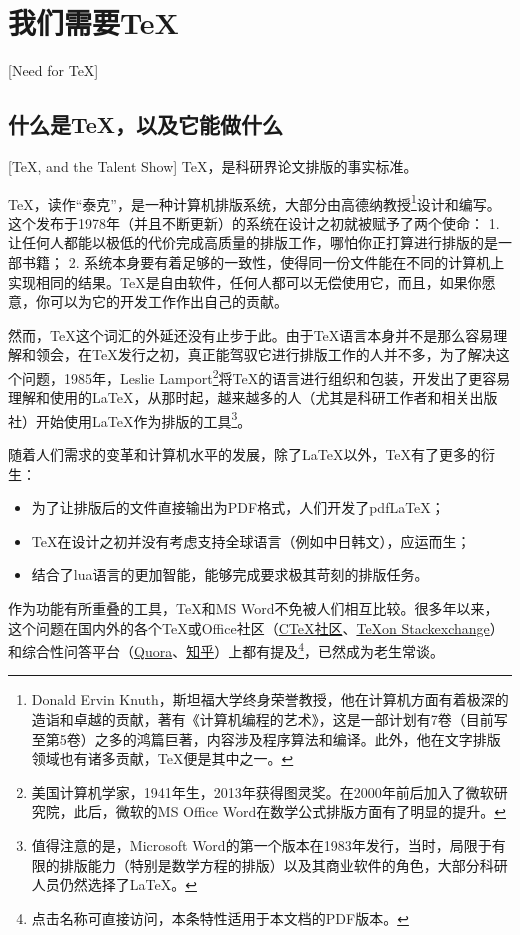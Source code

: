 \section{我们需要\TeX}[Need for \TeX ]
\subsection{什么是\TeX ，以及它能做什么}[\TeX , and the Talent Show]\label{sec:whatistex}
\TeX ，是科研界论文排版的事实标准。

\TeX ，读作“泰克”，是一种计算机排版系统，大部分由高德纳教授\footnote{Donald Ervin Knuth，斯坦福大学终身荣誉教授，他在计算机方面有着极深的造诣和卓越的贡献，著有《计算机编程的艺术》\cite{Knuth:ACPV1,Knuth:ACPV2,Knuth:ACPV3}，这是一部计划有7卷（目前写至第5卷）之多的鸿篇巨著，内容涉及程序算法和编译。此外，他在文字排版领域也有诸多贡献，\TeX 便是其中之一。}设计和编写。这个发布于1978年（并且不断更新）的系统在设计之初就被赋予了两个使命：
1. 让任何人都能以极低的代价完成高质量的排版工作，哪怕你正打算进行排版的是一部书籍；
2. 系统本身要有着足够的一致性，使得同一份文件能在不同的计算机上实现相同的结果。\TeX 是自由软件，任何人都可以无偿使用它，而且，如果你愿意，你可以为它的开发工作作出自己的贡献。

然而，\TeX 这个词汇的外延还没有止步于此。由于\TeX 语言本身并不是那么容易理解和领会，在\TeX 发行之初，真正能驾驭它进行排版工作的人并不多，为了解决这个问题，1985年，Leslie Lamport\footnote{美国计算机学家，1941年生，2013年获得图灵奖。在2000年前后加入了微软研究院，此后，微软的MS Office Word在数学公式排版方面有了明显的提升。}将\TeX 的语言进行组织和包装，开发出了更容易理解和使用的\LaTeX ，从那时起，越来越多的人（尤其是科研工作者和相关出版社）开始使用\LaTeX 作为排版的工具\footnote{值得注意的是，Microsoft Word的第一个版本在1983年发行，当时，局限于有限的排版能力（特别是数学方程的排版）以及其商业软件的角色，大部分科研人员仍然选择了\LaTeX 。}。

随着人们需求的变革和计算机水平的发展，除了\LaTeX 以外，\TeX 有了更多的衍生：

\begin{itemize}
	\item 为了让排版后的文件直接输出为PDF格式，人们开发了pdf\LaTeX ；
	\item \TeX  在设计之初并没有考虑支持全球语言（例如中日韩文），\XeLaTeX 应运而生；
	\item 结合了lua语言的\LuaLaTeX 更加智能，能够完成要求极其苛刻的排版任务。
\end{itemize}

作为功能有所重叠的工具，\TeX 和MS Word不免被人们相互比较。很多年以来，这个问题在国内外的各个\TeX 或Office社区（\href{www.ctex.org}{C\TeX 社区}、\href{tex.stackexchange.com}{\TeX on Stackexchange}）和综合性问答平台（\href{www.quora.com}{Quora}、\href{www.zhihu.com}{知乎}）上都有提及\footnote{点击名称可直接访问，本条特性适用于本文档的PDF版本。}，已然成为老生常谈。

